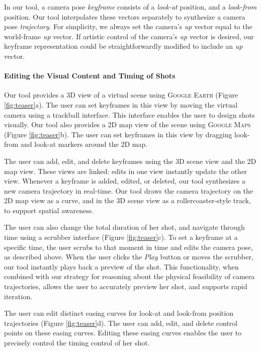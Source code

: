In our tool, a camera pose \emph{keyframe} consists of a \emph{look-at} position, and a \emph{look-from} position.
Our tool interpolates these vectors separately to synthesize a camera pose \emph{trajectory}.
For simplicity, we always set the camera's \emph{up} vector equal to the world-frame \emph{up} vector.
If artistic control of the camera's \emph{up} vector is desired, our keyframe representation could be straightforwardly modified to include an \emph{up} vector. 

\paragraph{Editing the Visual Content and Timing of Shots}

Our tool provides a 3D view of a virtual scene using \textsc{Google Earth} (Figure \ref{fig:teaser}a).
The user can set keyframes in this view by moving the virtual camera using a trackball interface.
This interface enables the user to design shots visually.
Our tool also provides a 2D map view of the scene using \textsc{Google Maps} (Figure \ref{fig:teaser}b).
The user can set keyframes in this view by dragging look-from and look-at markers around the 2D map.

The user can add, edit, and delete keyframes using the 3D scene view and the 2D map view.
These views are linked: edits in one view instantly update the other view.
Whenever a keyframe is added, edited, or deleted, our tool synthesizes a new camera trajectory in real-time.
Our tool draws the camera trajectory on the 2D map view as a curve, and in the 3D scene view as a rollercoaster-style track, to support spatial awareness.

The user can also change the total duration of her shot, and navigate through time using a scrubber interface (Figure \ref{fig:teaser}c). To set a keyframe at a specific time, the user scrubs to that moment in time and edits the camera pose, as described above.
When the user clicks the \emph{Play} button or moves the scrubber, our tool instantly plays back a preview of the shot.
This functionality, when combined with our strategy for reasoning about the physical feasibility of camera trajectories, allows the user to accurately preview her shot, and supports rapid iteration.

The user can edit distinct easing curves for look-at and look-from position trajectories (Figure \ref{fig:teaser}d).
The user can add, edit, and delete control points on these easing curves.
Editing these easing curves enables the user to precisely control the timing control of her shot.

